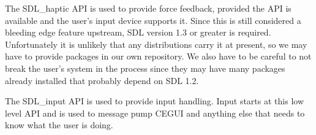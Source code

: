 

\startitemize[4]

The SDL_haptic API is used to provide force feedback, provided the API is available and the user's input device supports it. Since this is still considered a bleeding edge feature upstream, SDL version 1.3 or greater is required. Unfortunately it is unlikely that any distributions carry it at present, so we may have to provide packages in our own repository. We also have to be careful to not break the user's system in the process since they may have many packages already installed that probably depend on SDL 1.2.


The SDL_input API is used to provide input handling. Input starts at this low level API and is used to message pump CEGUI and anything else that needs to know what the user is doing.
\stopitemize

